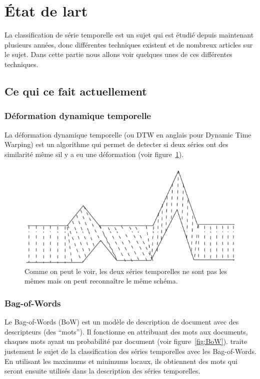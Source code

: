 \documentclass[11pt]{sdm}
\begin{document}
\section{\'Etat de l\textquotesingle art}
	La classification de s\'erie temporelle est un sujet qui est \'etudi\'e depuis maintenant plusieurs ann\'ees, donc diff\'erentes techniques existent et de nombreux articles sur le sujet. Dans cette partie nous allons voir quelques unes de ces diff\'erentes techniques.

	\subsection{Ce qui ce fait actuellement}
		\subsubsection{D\'eformation dynamique temporelle}
			La d\'eformation dynamique temporelle (ou DTW en anglais pour Dynamic Time Warping) est un algorithme qui permet de detecter si deux s\'eries ont des similarit\'e m\^eme s\textquotesingle il y a eu une d\'eformation (voir figure~\ref{fig:dtw}).

			\begin{figure}[!ht]
				\centering
				\includegraphics[scale=0.6,natwidth=582,natheight=269]{figures/dtw.png}
				\caption{Comme on peut le voir, les deux s\'eries temporelles ne sont pas les m\^emes mais on peut reconna\^itre le m\^eme sch\'ema.}
				\label{fig:dtw}
			\end{figure}

		\subsubsection{Bag-of-Words}	
			Le Bag-of-Words (BoW) est un mod\`ele de description de document avec des descripteurs (des “mots”). Il fonctionne en attribuant des mots aux documents, chaques mots ayant un probabilit\'e par document (voir figure~\ref{fig:BoW}). \cite{bailly2015bag} traite justement le sujet de la classification des s\'eries temporelles avec les Bag-of-Words. En utilisant les maximums et minimums locaux, ils obtiennent des mots qui seront ensuite utilis\'es dans la description des s\'eries temporelles.
\end{document}
